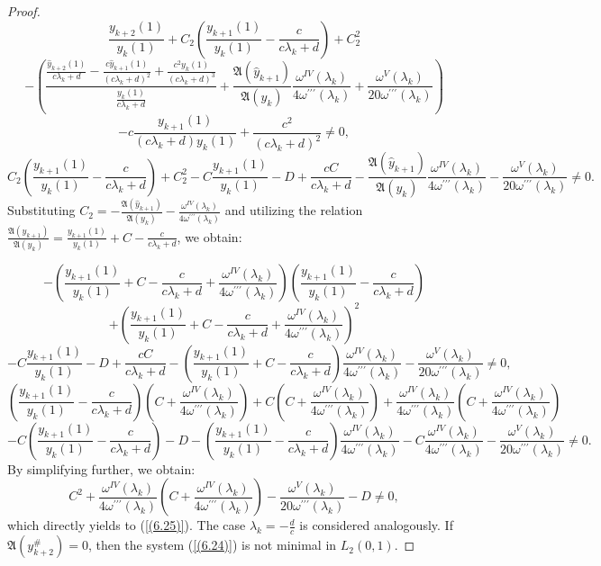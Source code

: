 \documentclass[10pt,a4paper]{amsart}
\numberwithin{equation}{section}
\begin{document}
\begin{proof}
$$
\frac{y_{k+2}(1)}{y_k(1)} + C_2\left(\frac{y_{k+1}(1)}{y_k(1)} - \frac{c}{c\lambda_k+d}\right) + C_2^2 $$
$$- \left( \frac{\frac{\hat{y}_{k+2}(1)}{c\lambda_k+d} - \frac{c\hat{y}_{k+1}(1)}{(c\lambda_k+d)^2} + \frac{c^2y_k(1)}{(c\lambda_k+d)^3}}{\frac{y_k(1)}{c\lambda_k+d}} + \frac{\mathfrak{A}(\hat{y}_{k+1})}{\mathfrak{A}(y_k)}\frac{\omega^{IV}(\lambda_k)}{4\omega^{\prime\prime\prime}(\lambda_k)} + \frac{\omega^{V}(\lambda_k)}{20\omega^{\prime\prime\prime}(\lambda_k)} \right) $$
$$- c\frac{y_{k+1}(1)}{(c\lambda_k+d)y_k(1)} + \frac{c^2}{(c\lambda_k+d)^2} \neq 0,
$$
$$
C_2\left(\frac{y_{k+1}(1)}{y_k(1)} - \frac{c}{c\lambda_k+d}\right) + C_2^2 - C\frac{y_{k+1}(1)}{y_k(1)} - D + \frac{cC}{c\lambda_k+d} - \frac{\mathfrak{A}(\hat{y}_{k+1})}{\mathfrak{A}(y_k)}\frac{\omega^{IV}(\lambda_k)}{4\omega^{\prime\prime\prime}(\lambda_k)} - \frac{\omega^{V}(\lambda_k)}{20\omega^{\prime\prime\prime}(\lambda_k)} \neq 0.
$$
Substituting $C_2 = -\frac{\mathfrak{A}(\hat{y}_{k+1})}{\mathfrak{A}(y_k)} - \frac{\omega^{IV}(\lambda_k)}{4\omega^{\prime\prime\prime}(\lambda_k)}$ and utilizing the relation $\frac{\mathfrak{A}(\hat{y}_{k+1})}{\mathfrak{A}(y_k)} = \frac{y_{k+1}(1)}{y_k(1)} + C - \frac{c}{c\lambda_k+d}$, we obtain:

$$
-\left(\frac{y_{k+1}(1)}{y_k(1)} + C - \frac{c}{c\lambda_k+d} + \frac{\omega^{IV}(\lambda_k)}{4\omega^{\prime\prime\prime}(\lambda_k)}\right)\left(\frac{y_{k+1}(1)}{y_k(1)} - \frac{c}{c\lambda_k+d}\right)$$
$$+ \left(\frac{y_{k+1}(1)}{y_k(1)} + C - \frac{c}{c\lambda_k+d} + \frac{\omega^{IV}(\lambda_k)}{4\omega^{\prime\prime\prime}(\lambda_k)}\right)^2 
$$
$$
- C\frac{y_{k+1}(1)}{y_k(1)} - D + \frac{cC}{c\lambda_k+d} - \left(\frac{y_{k+1}(1)}{y_k(1)} + C - \frac{c}{c\lambda_k+d}\right)\frac{\omega^{IV}(\lambda_k)}{4\omega^{\prime\prime\prime}(\lambda_k)} - \frac{\omega^{V}(\lambda_k)}{20\omega^{\prime\prime\prime}(\lambda_k)} \neq 0,
$$
$$
\left(\frac{y_{k+1}(1)}{y_k(1)} - \frac{c}{c\lambda_k+d}\right)\left(C + \frac{\omega^{IV}(\lambda_k)}{4\omega^{\prime\prime\prime}(\lambda_k)}\right) + C\left(C + \frac{\omega^{IV}(\lambda_k)}{4\omega^{\prime\prime\prime}(\lambda_k)}\right) + \frac{\omega^{IV}(\lambda_k)}{4\omega^{\prime\prime\prime}(\lambda_k)}\left(C + \frac{\omega^{IV}(\lambda_k)}{4\omega^{\prime\prime\prime}(\lambda_k)}\right) 
$$
$$
- C\left(\frac{y_{k+1}(1)}{y_k(1)} - \frac{c}{c\lambda_k+d}\right) - D - \left(\frac{y_{k+1}(1)}{y_k(1)} - \frac{c}{c\lambda_k+d}\right)\frac{\omega^{IV}(\lambda_k)}{4\omega^{\prime\prime\prime}(\lambda_k)} - C\frac{\omega^{IV}(\lambda_k)}{4\omega^{\prime\prime\prime}(\lambda_k)} - \frac{\omega^{V}(\lambda_k)}{20\omega^{\prime\prime\prime}(\lambda_k)} \neq 0.
$$
By simplifying further, we obtain:
$$
C^2 + \frac{\omega^{IV}(\lambda_k)}{4\omega^{\prime\prime\prime}(\lambda_k)}\left(C + \frac{\omega^{IV}(\lambda_k)}{4\omega^{\prime\prime\prime}(\lambda_k)}\right) - \frac{\omega^{V}(\lambda_k)}{20\omega^{\prime\prime\prime}(\lambda_k)} - D \neq 0,
$$
which directly yields to (\ref{(6.25)}).
The case $\lambda_k=-\frac{d}{c}$ is considered analogously. If $\mathfrak{A}(y_{k+2}^{\#})=0$, then the system (\ref{(6.24)}) is not minimal in $L_2(0,1)$.
\end{proof}
\end{document}
